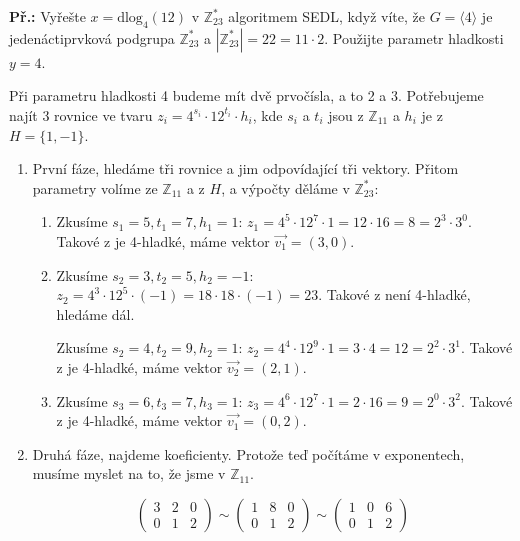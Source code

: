 \documentclass[10pt,a4paper]{article}
\begin{document}
\begin{exercise}
\textbf{Př.:} Vyřešte $x = \text{dlog}_4 (12)$ v $\mathbb{Z}_{23}^*$ algoritmem
SEDL, když víte, že $G = \langle 4 \rangle$ je jedenáctiprvková podgrupa
$\mathbb{Z}_{23}^*$ a $|\mathbb{Z}_{23}^*| = 22 = 11 \cdot 2$. Použijte parametr
hladkosti $y = 4$.

Při parametru hladkosti 4 budeme mít dvě prvočísla, a to 2 a 3. Potřebujeme
najít 3 rovnice ve tvaru $z_i = 4^{s_i}\cdot 12^{t_i}\cdot h_i$, kde $s_i$ a
$t_i$ jsou z $\mathbb{Z}_{11}$ a $h_i$ je z $H = \{1, -1\}$.

\begin{enumerate}

\item První fáze, hledáme tři rovnice a jim odpovídající tři vektory. Přitom
parametry volíme ze $\mathbb{Z}_{11}$ a z $H$, a výpočty děláme v
$\mathbb{Z}_{23}^*$:

\begin{enumerate}
\item Zkusíme $s_1 = 5, t_1 = 7, h_1 = 1$: $z_1 = 4^5 \cdot 12^7 \cdot 1 = 12
\cdot 16 = 8 = 2^3 \cdot 3^0$. Takové z je 4-hladké, máme vektor $\vec{v_1} =
(3, 0)$.
\item Zkusíme $s_2 = 3, t_2 = 5, h_2 = -1$: $z_2 = 4^3 \cdot 12^5 \cdot (-1) =
18 \cdot 18 \cdot (-1) = 23 $. Takové z není 4-hladké, hledáme dál.

Zkusíme $s_2 = 4, t_2 = 9, h_2 = 1$: $z_2 = 4^4 \cdot 12^9 \cdot 1= 3 \cdot 4 =
12 = 2^2 \cdot 3^1 $. Takové z je 4-hladké, máme vektor $\vec{v_2} = (2, 1)$.
\item Zkusíme $s_3 = 6, t_3 = 7, h_3 = 1$: $z_3 = 4^6 \cdot 12^7 \cdot 1 = 2
\cdot 16 = 9 = 2^0 \cdot 3^2$. Takové z je 4-hladké, máme vektor $\vec{v_1} =
(0, 2)$.
\end{enumerate}
\item Druhá fáze, najdeme koeficienty. Protože teď počítáme v exponentech,
musíme myslet na to, že jsme v $\mathbb{Z}_{11}$.

\[ \left( \begin{array}{ccc}
3 & 2 & 0\\
0 & 1 & 2 \end{array} \right)
%
\sim
%
\left( \begin{array}{ccc}
1 & 8 & 0\\
0 & 1 & 2 \end{array} \right)
%
\sim
%
\left( \begin{array}{ccc}
1 & 0 & 6\\
0 & 1 & 2 \end{array} \right) \]


\end{enumerate}
\end{exercise}
\end{document}
